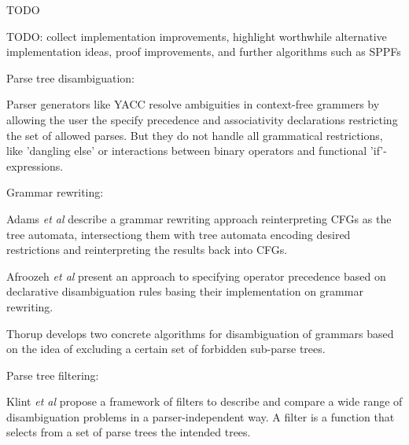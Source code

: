 %
\begin{isabellebody}%
%
%
\isadelimtheory
%
\endisadelimtheory
%
\isatagtheory
%
\endisatagtheory
{\isafoldtheory}%
%
\isadelimtheory
%
\endisadelimtheory
%
\isadelimdocument
%
\endisadelimdocument
%
\isatagdocument
%
\isamarkuptrue%
%
\isamarkuptrue%
%
\endisatagdocument
{\isafolddocument}%
%
\isadelimdocument
%
\endisadelimdocument
%
\begin{isamarkuptext}%
TODO%
\end{isamarkuptext}\isamarkuptrue%
%
\isadelimdocument
%
\endisadelimdocument
%
\isatagdocument
%
\isamarkuptrue%
%
\endisatagdocument
{\isafolddocument}%
%
\isadelimdocument
%
\endisadelimdocument
%
\begin{isamarkuptext}%
TODO: collect implementation improvements, highlight worthwhile alternative implementation ideas,
  proof improvements, and further algorithms such as SPPFs%
\end{isamarkuptext}\isamarkuptrue%
%
\begin{isamarkuptext}%
Parse tree disambiguation:

Parser generators like YACC resolve ambiguities in context-free grammers by allowing the user
the specify precedence and associativity declarations restricting the set of allowed parses. But they
do not handle all grammatical restrictions, like 'dangling else' or interactions between binary operators
and functional 'if'-expressions.

Grammar rewriting:

Adams \textit{et al} \cite{Adams:2017} describe a grammar rewriting approach reinterpreting CFGs as
the tree automata, intersectiong them with tree automata encoding desired restrictions and reinterpreting
the results back into CFGs.

Afroozeh \textit{et al} \cite{Afroozeh:2013} present an approach to specifying operator precedence
based on declarative disambiguation rules basing their implementation on grammar rewriting.

Thorup \cite{Thorup:1996} develops two concrete algorithms for disambiguation of grammars based on the idea of 
excluding a certain set of forbidden sub-parse trees.

Parse tree filtering:

Klint \textit{et al} \cite{Klint:1997} propose a framework of filters to describe and compare a wide
range of disambiguation problems in a parser-independent way. A filter is a function that selects
from a set of parse trees the intended trees.%
\end{isamarkuptext}\isamarkuptrue%
%
\isadelimtheory
%
\endisadelimtheory
%
\isatagtheory
%
\endisatagtheory
{\isafoldtheory}%
%
\isadelimtheory
%
\endisadelimtheory
%
\end{isabellebody}%
